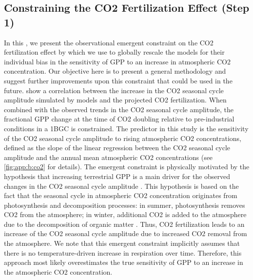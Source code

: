\subsection{Constraining the \texorpdfstring{\acs{CO2}}{} Fertilization
  Effect (Step 1)}
\label{subsec:06:step_1}

In this , we present the observational emergent
constraint on the \ac{CO2} fertilization effect by \textcite{Wenzel2016} which
we use to globally rescale the models for their individual bias in the
sensitivity of \ac{GPP} to an increase in atmospheric \ac{CO2} concentration.
Our objective here is to present a general methodology and suggest further
improvements upon this constraint that could be used in the future.
\textcite{Wenzel2016} show a correlation between the increase in the \ac{CO2}
seasonal cycle amplitude simulated by models and the projected \ac{CO2}
fertilization. When combined with the observed trends in the \ac{CO2} seasonal
cycle amplitude, the fractional \ac{GPP} change at the time of \ac{CO2}
doubling relative to pre-industrial conditions in a \ac{1BGC} is constrained.
The predictor in this study is the sensitivity of the \ac{CO2} seasonal cycle
amplitude to rising atmospheric \ac{CO2} concentrations, defined as the slope
of the linear regression between the \ac{CO2} seasonal cycle amplitude and the
annual mean atmospheric \ac{CO2} concentrations (see \cref{fig:app:b:co2} for
details). The emergent constraint is physically motivated by the hypothesis
that increasing terrestrial \ac{GPP} is a main driver for the observed changes
in the \ac{CO2} seasonal cycle amplitude \autocite{Gray2014, Keeling1996,
  Zhao2014}. This hypothesis is based on the fact that the seasonal cycle in
atmospheric \ac{CO2} concentration originates from photosynthesis and
decomposition processes: in summer, photosynthesis removes \ac{CO2} from the
atmosphere; in winter, additional \ac{CO2} is added to the atmosphere due to
the decomposition of organic matter \autocite{Keeling1995}. Thus, \ac{CO2}
fertilization leads to an increase of the \acs{CO2} seasonal cycle amplitude
due to increased \acs{CO2} removal from the atmosphere. We note that this
emergent constraint implicitly assumes that there is no temperature-driven
increase in respiration over time. Therefore, this approach most likely
overestimates the true sensitivity of \ac{GPP} to an increase in the
atmospheric \ac{CO2} concentration.

